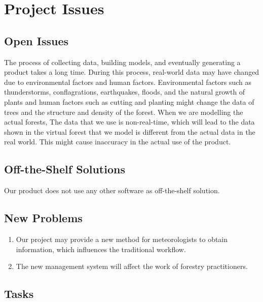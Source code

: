 \documentclass{article}
\begin{document}
\newpage

\section{Project Issues}
\subsection{Open Issues}
The process of collecting data, building models, and eventually generating a product takes a long time. During this process, real-world data may have changed due to environmental factors and human factors. Environmental factors such as thunderstorms, conflagrations, earthquakes, floods, and the natural growth of plants and human factors such as cutting and planting might change the data of trees and the structure and density of the forest. When we are modelling the actual forests, The data that we use is non-real-time, which will lead to the data shown in the virtual forest that we model is different from the actual data in the real world. This might cause inaccuracy in the actual use of the product.
\subsection{Off-the-Shelf Solutions}
Our product does not use any other software as off-the-shelf solution. 

\subsection{New Problems}
\begin{enumerate}
    \item Our project may provide a new method for meteorologists to obtain information, which influences the traditional workflow. 
    \item The new management system will affect the work of forestry practitioners.
    
\end{enumerate}
\subsection{Tasks}
\end{document}
